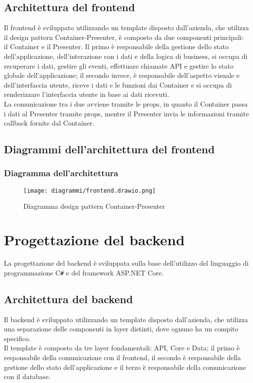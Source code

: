 \subsection{Architettura del frontend}
Il frontend è sviluppato utilizzando un template disposto dall'azienda, che utilizza il design pattern Container-Presenter, è composto da due componenti principali: il Container e il Presenter.
Il primo è responsabile della gestione dello stato dell'applicazione, dell'interazione con i dati e della logica di business, si occupa di recuperare i dati, gestire gli eventi, effettuare chiamate API e gestire lo stato globale dell'applicazione; il secondo invece, è responsabile dell'aspetto visuale e dell'interfaccia utente, riceve i dati e le funzioni dai Container e si occupa di renderizzare l'interfaccia utente in base ai dati ricevuti.\\
La comunicazione tra i due avviene tramite le props, in quanto il Container passa i dati al Presenter tramite props, mentre il Presenter invia le informazioni tramite callback fornite dal Container.\\

\subsection{Diagrammi dell'architettura del frontend}
\subsubsection{Diagramma dell'architettura}
\begin{figure}[!h] 
    \centering 
    \texttt{[image: diagrammi/frontend.drawio.png]} 
    \caption{Diagramma design pattern Container-Presenter}
\end{figure}
\clearpage
\section{Progettazione del backend}
La progettazione del backend è sviluppata sulla base dell'utilizzo del linguaggio di programmazione C\texttt{\#} e del framework ASP.NET Core.\\

\subsection{Architettura del backend}
Il backend è sviluppato utilizzando un template disposto dall'azienda, che utilizza una separazione delle componenti in layer distinti, dove ognuno ha un compito specifico.\\
Il template è composto da tre layer fondamentali: API, Core e Data; il primo è responsabile della comunicazione con il frontend, il secondo è responsabile della gestione dello stato dell'applicazione e il terzo è responsabile della comunicazione con il database.\\

